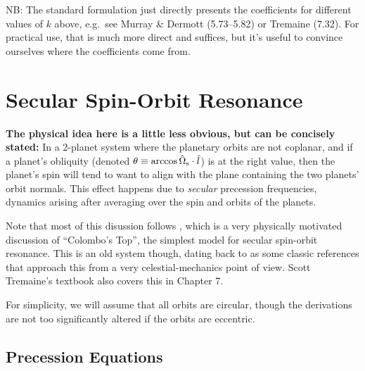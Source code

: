 \documentclass[11pt,
        usenames, %
        dvipsnames %
    ]{article}
\begin{document}
NB\@: The standard formulation just directly presents the coefficients for
different values of $k$ above, e.g.\ see Murray \& Dermott (5.73--5.82) or
Tremaine (7.32). For practical use, that is much more direct and suffices, but
it's useful to convince ourselves where the coefficients come from.

\section{Secular Spin-Orbit Resonance}

\textbf{The physical idea here is a little less obvious, but can be concisely
stated:} In a 2-planet system where the planetary orbits are not coplanar, and
if a planet's obliquity (denoted $\theta \equiv \arccos \hat{\Omega}_{\rm s}
\cdot \hat{l}$) is at the right value, then the planet's spin will tend to want
to align with the plane containing the two planets' orbit normals. This effect
happens due to \emph{secular} precession frequencies, dynamics arising after
averaging over the spin and orbits of the planets.

Note that most of this disussion follows \citet{su2022dynamics}, which is a very
physically motivated discussion of ``Colombo's Top'', the simplest model for
secular spin-orbit resonance. This is an old system though, dating back to
\citet{colombo1966cassini, henrard1987colombo} as some classic references that
approach this from a very celestial-mechanics point of view. Scott Tremaine's
textbook also covers this in Chapter 7.

For simplicity, we will assume that all orbits are circular, though the
derivations are not too significantly altered if the orbits are eccentric.

\subsection{Precession Equations}
\end{document}
